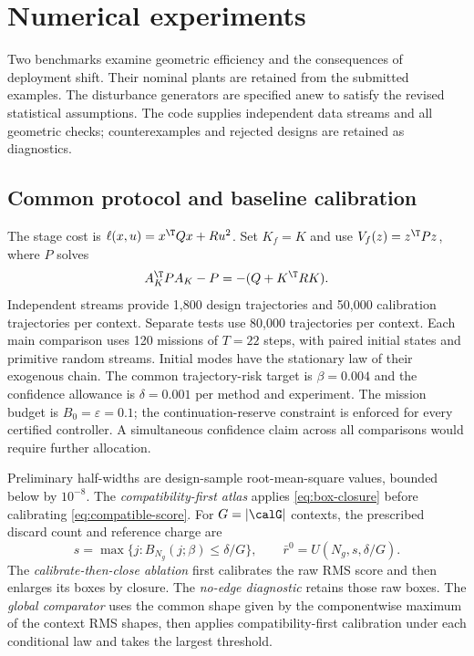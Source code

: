 \section{Numerical experiments}
\label{sec:numerics}

Two benchmarks examine geometric efficiency and the consequences of deployment shift. Their nominal plants are retained from the submitted examples. The disturbance generators are specified anew to satisfy the revised statistical assumptions. The code supplies independent data streams and all geometric checks; counterexamples and rejected designs are retained as diagnostics.

\subsection{Common protocol and baseline calibration}
\label{subsec:numeric-protocol}

The stage cost is $\ell(x,u)=x^\T Qx+Ru^2$. Set $K_f=K$ and use $V_f(z)=z^\T Pz$, where $P$ solves
\begin{equation}
 A_K^\T PA_K-P=-(Q+K^\T RK).
 \label{eq:numeric-terminal-cost}
\end{equation}
Independent streams provide 1,800 design trajectories and 50,000 calibration trajectories per context. Separate tests use 80,000 trajectories per context. Each main comparison uses 120 missions of $T=22$ steps, with paired initial states and primitive random streams. Initial modes have the stationary law of their exogenous chain. The common trajectory-risk target is $\beta=0.004$ and the confidence allowance is $\delta=0.001$ per method and experiment. The mission budget is $B_0=\varepsilon=0.1$; the continuation-reserve constraint is enforced for every certified controller. A simultaneous confidence claim across all comparisons would require further allocation.

Preliminary half-widths are design-sample root-mean-square values, bounded below by $10^{-8}$. The \emph{compatibility-first atlas} applies \eqref{eq:box-closure} before calibrating \eqref{eq:compatible-score}. For $G=|\calG|$ contexts, the prescribed discard count and reference charge are
\begin{equation}
 s=\max\{j:B_{N_g}(j;\beta)\le\delta/G\},\qquad
 \bar r^0=U(N_g,s,\delta/G).
 \label{eq:numeric-rank}
\end{equation}
The \emph{calibrate-then-close ablation} first calibrates the raw RMS score and then enlarges its boxes by closure. The \emph{no-edge diagnostic} retains those raw boxes. The \emph{global comparator} uses the common shape given by the componentwise maximum of the context RMS shapes, then applies compatibility-first calibration under each conditional law and takes the largest threshold.

